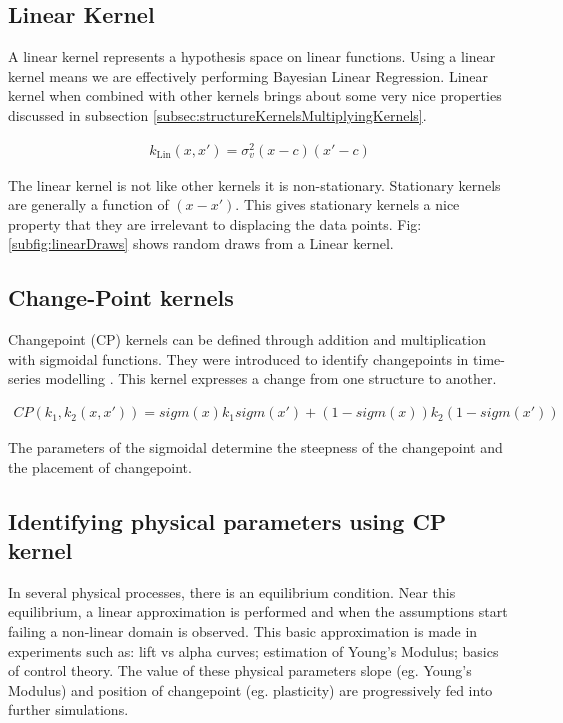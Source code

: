 \subsection{Linear Kernel} 
A linear kernel represents a hypothesis space on linear functions. Using a linear kernel means we are effectively performing Bayesian Linear Regression. Linear kernel when combined with other kernels brings about some very nice properties discussed in subsection \ref{subsec:structureKernelsMultiplyingKernels}.

\begin{align}
k_{\textrm{Lin}}(x, x') = \sigma_v^2(x - c)(x' - c)
\end{align}

The linear kernel is not like other kernels it is non-stationary. Stationary kernels are generally a function of $(x-x')$. This gives stationary kernels a nice property that they are irrelevant to displacing the data points. Fig: \ref{subfig:linearDraws} shows random draws from a Linear kernel.

\subsection{Change-Point kernels}
Changepoint (CP) kernels can be defined through addition and multiplication with sigmoidal functions. They were introduced to identify changepoints in time-series modelling \cite{osborne2010bayesian}. This kernel expresses a change from one structure to another. 

\begin{align} \label{eq:changePointKernel}
CP(k_{1}, k_{2}(x, x')) = sigm(x)k_{1}sigm(x') + (1-sigm(x))k_{2}(1-sigm(x'))
\end{align}

The parameters of the sigmoidal determine the steepness of the changepoint and the placement of changepoint.

\subsection*{Identifying physical parameters using CP kernel}\label{subsubsec:applicationCP}
In several physical processes, there is an equilibrium condition. Near this equilibrium, a linear approximation is performed and when the assumptions start failing a non-linear domain is observed. This basic approximation is made in experiments such as: lift vs alpha curves; estimation of Young's Modulus; basics of control theory. The value of these physical parameters slope (eg. Young's Modulus) and position of changepoint (eg. plasticity) are progressively fed into further simulations. 

